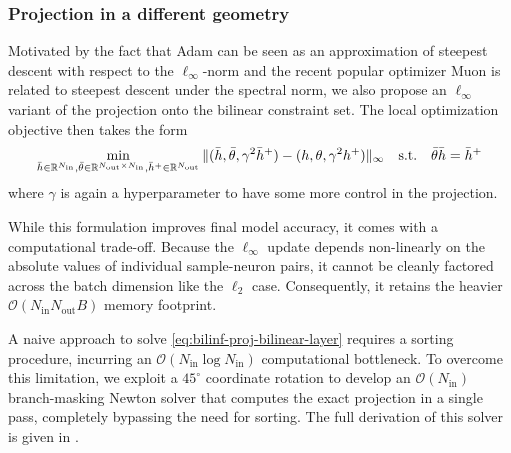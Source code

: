 \documentclass{article}
\let\cref\crtcref
\begin{document}
\subsubsection{Projection in a different geometry}
Motivated by the fact that Adam \cite{kingma2014adam} can be seen as an approximation of steepest descent with respect to the $\ell_\infty$-norm  \cite{xie2024implicit} and the recent popular optimizer Muon \cite{jordan2024muon} is related to steepest descent under the spectral norm, we also propose an $\ell_\infty$ variant of the projection onto the bilinear constraint set. The local optimization objective then takes the form
\begin{equation}
\label{eq:bilinf-proj-bilinear-layer}
\min_{\bar{h} \in \mathbb{R}^{N_{\rm in}}, \bar{\theta} \in \mathbb{R}^{N_{\rm out} \times N_{\rm in}}, \bar{h}^+ \in \mathbb{R}^{N_{\rm out}}} \| (\bar{h}, \bar{\theta}, \gamma^2 \bar{h}^+) - (h, \theta, \gamma^2 h^+) \|_\infty \quad \text{s.t.} \quad \bar{\theta} \bar{h} = \bar{h}^+
\end{equation}
where $\gamma$ is again a hyperparameter to have some more control in the projection.

While this formulation improves final model accuracy, it comes with a computational trade-off. Because the $\ell_\infty$ update depends non-linearly on the absolute values of individual sample-neuron pairs, it cannot be cleanly factored across the batch dimension like the $\ell_2$ case. Consequently, it retains the heavier $\mathcal{O}(N_{\mathrm{in}}N_{\mathrm{out}}B)$ memory footprint.%

A naive approach to solve \eqref{eq:bilinf-proj-bilinear-layer} requires a sorting procedure, incurring an $\mathcal{O}(N_{\mathrm{in}} \log N_{\mathrm{in}})$ computational bottleneck. To overcome this limitation, we exploit a $45^\circ$ coordinate rotation to develop an $\mathcal{O}(N_{\mathrm{in}})$ branch-masking Newton solver that computes the exact projection in a single pass, completely bypassing the need for sorting. The full derivation of this solver is given in \cref{sec:linf}.
\end{document}
